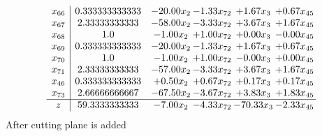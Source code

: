 \documentclass[8pt]{article}
\begin{document}
\[\begin{array}{c| c c@{\hskip 2pt} c@{\hskip 2pt} c@{\hskip 2pt} c@{\hskip 2pt} }
 x_{66}   &  0.333333333333 & -20.00 x_{2} & -1.33 x_{72} & +  1.67 x_{3} & +  0.67 x_{45}\\
 x_{67}   &  2.33333333333 & -58.00 x_{2} & -3.33 x_{72} & +  3.67 x_{3} & +  1.67 x_{45}\\
 x_{68}   &  1.0 & -1.00 x_{2} & +  1.00 x_{72} & +  0.00 x_{3} & -0.00 x_{45}\\
 x_{69}   &  0.333333333333 & -20.00 x_{2} & -1.33 x_{72} & +  1.67 x_{3} & +  0.67 x_{45}\\
 x_{70}   &  1.0 & -1.00 x_{2} & +  1.00 x_{72} & -0.00 x_{3} & +  0.00 x_{45}\\
 x_{71}   &  2.33333333333 & -57.00 x_{2} & -3.33 x_{72} & +  3.67 x_{3} & +  1.67 x_{45}\\
 x_{46}   &  0.333333333333 & +  0.50 x_{2} & +  0.67 x_{72} & +  0.17 x_{3} & +  0.17 x_{45}\\
 x_{73}   &  2.66666666667 & -67.50 x_{2} & -3.67 x_{72} & +  3.83 x_{3} & +  1.83 x_{45}\\
\hline
z    &  59.3333333333 & -7.00 x_{2} & -4.33 x_{72} & -70.33 x_{3} & -2.33 x_{45}\\
\end{array}\]
 After cutting plane is added 
\end{document}

